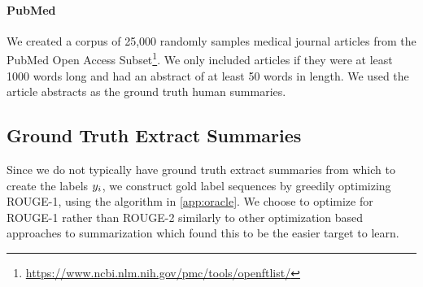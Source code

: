 \paragraph{PubMed}{We created a corpus of 25,000 randomly samples 
    medical journal articles from the PubMed Open Access 
    Subset\footnote{\url{https://www.ncbi.nlm.nih.gov/pmc/tools/openftlist/}}.
    We only included articles if they were at least 1000 words long and 
    had an abstract of at least 50 words in length.
We used the article abstracts as the ground truth human summaries.}

\subsection{Ground Truth Extract Summaries}
Since we do not typically have ground truth extract summaries from which to
create the labels $\slabel_i$, we construct gold label sequences 
by greedily optimizing ROUGE-1, using the algorithm in \autoref{app:oracle}.
We choose to optimize for ROUGE-1 rather than 
ROUGE-2 similarly to other optimization based approaches to summarization 
\cite{sipos2012large,durrett2016learning} which found this to
be the easier target to learn.



